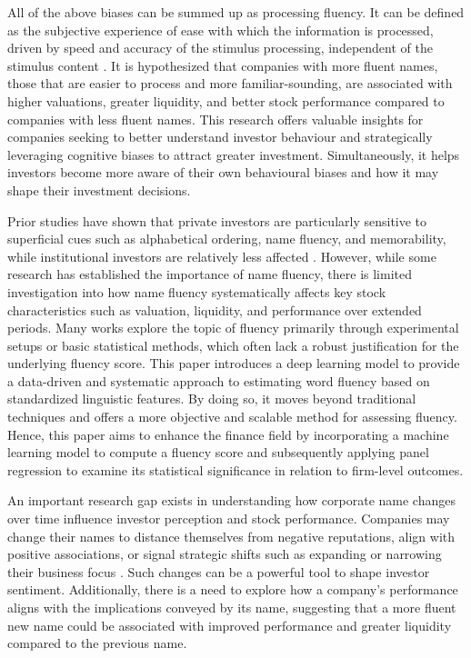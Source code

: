 \documentclass[a4paper,11pt]{report}
\begin{document}
All of the above biases can be summed up as processing fluency. It can be defined as the subjective experience of ease with which the information is processed, driven by speed and accuracy of the stimulus processing, independent of the stimulus content \cite{def_fluency}. It is hypothesized that companies with more fluent names, those that are easier to process and more familiar-sounding, are associated with higher valuations, greater liquidity, and better stock performance compared to companies with less fluent names. This research offers valuable insights for companies seeking to better understand investor behaviour and strategically leveraging cognitive biases to attract greater investment. Simultaneously, it helps investors become more aware of their own behavioural biases and how it may shape their investment decisions.

Prior studies have shown that private investors are particularly sensitive to superficial cues such as alphabetical ordering, name fluency, and memorability, while institutional investors are relatively less affected \cite{memory2}. However, while some research has established the importance of name fluency, there is limited investigation into how name fluency systematically affects key stock characteristics such as valuation, liquidity, and performance over extended periods. Many works explore the topic of fluency primarily through experimental setups or basic statistical methods, which often lack a robust justification for the underlying fluency score. This paper introduces a deep learning model to provide a data-driven and systematic approach to estimating word fluency based on standardized linguistic features. By doing so, it moves beyond traditional techniques and offers a more objective and scalable method for assessing fluency. Hence, this paper aims to enhance the finance field by incorporating a machine learning model to compute a fluency score and subsequently applying panel regression to examine its statistical significance in relation to firm-level outcomes.

An important research gap exists in understanding how corporate name changes over time influence investor perception and stock performance. Companies may change their names to distance themselves from negative reputations, align with positive associations, or signal strategic shifts such as expanding or narrowing their business focus \cite{change_in_name}. Such changes can be a powerful tool to shape investor sentiment. Additionally, there is a need to explore how a company’s performance aligns with the implications conveyed by its name, suggesting that a more fluent new name could be associated with improved performance and greater liquidity compared to the previous name.
\end{document}
